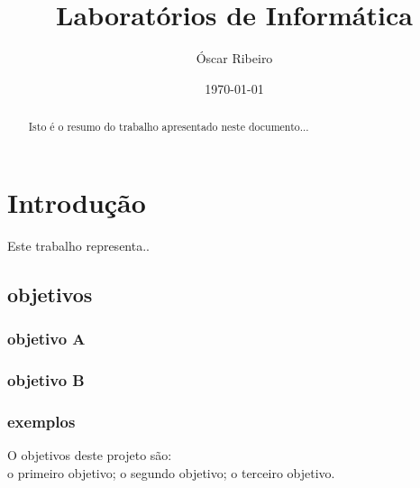 \documentclass[a4wide]{report}
\title{Laboratórios de Informática }
\author{Óscar Ribeiro}
\date{ \today } %
\begin{document}
\maketitle

\begin{abstract} %
Isto é o resumo do trabalho apresentado neste documento...
\end{abstract}

\tableofcontents
\listoffigures
\listoftables
\lstlistoflistings


\chapter{Introdução}
Este trabalho representa..
\section{objetivos}

\subsection{objetivo A}
\subsection{objetivo B}

\subsection{exemplos}

O objetivos deste projeto são: \\ 
o primeiro objetivo; 
o segundo objetivo;
o terceiro objetivo.
\end{document}
